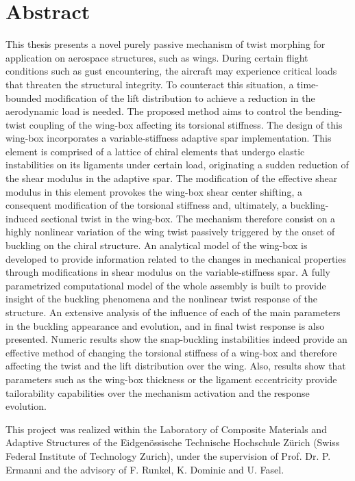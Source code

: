 \section*{Abstract}

This thesis presents a novel purely passive mechanism of twist morphing for application on aerospace structures, such as wings. During certain flight conditions such as gust encountering, the aircraft may experience critical loads that threaten the structural integrity. To counteract this situation, a time-bounded modification of the lift distribution to achieve a reduction in the aerodynamic load is needed. The proposed method aims to control the bending-twist coupling of the wing-box affecting its torsional stiffness. The design of this wing-box incorporates a variable-stiffness adaptive spar implementation. This element is comprised of a lattice of chiral elements that undergo elastic instabilities on its ligaments under certain load, originating a sudden reduction of the shear modulus in the adaptive spar. The modification of the effective shear modulus in this element provokes the wing-box shear center shifting, a consequent modification of the torsional stiffness and, ultimately, a buckling-induced sectional twist in the wing-box. The mechanism therefore consist on a highly nonlinear variation of the wing twist passively triggered by the onset of buckling on the chiral structure. An analytical model of the wing-box is developed to provide information related to the changes in mechanical properties through modifications in shear modulus on the variable-stiffness spar. A fully parametrized computational model of the whole assembly is built to provide insight of the buckling phenomena and the nonlinear twist response of the structure. An extensive analysis of the influence of each of the main parameters in the buckling appearance and evolution, and in final twist response is also presented. Numeric results show the snap-buckling instabilities indeed provide an effective method of changing the torsional stiffness of a wing-box and therefore affecting the twist and the lift distribution over the wing. Also, results show that parameters such as the wing-box thickness or the ligament eccentricity provide tailorability capabilities over the mechanism activation and the response evolution.



\vfill
\normalsize
\noindent
This project was realized within the Laboratory of Composite Materials and Adaptive Structures of the Eidgen\"ossische Technische Hochschule Z\"urich (Swiss Federal Institute of Technology Zurich), under the supervision of Prof. Dr. P. Ermanni and the advisory of F. Runkel, K. Dominic and U. Fasel.